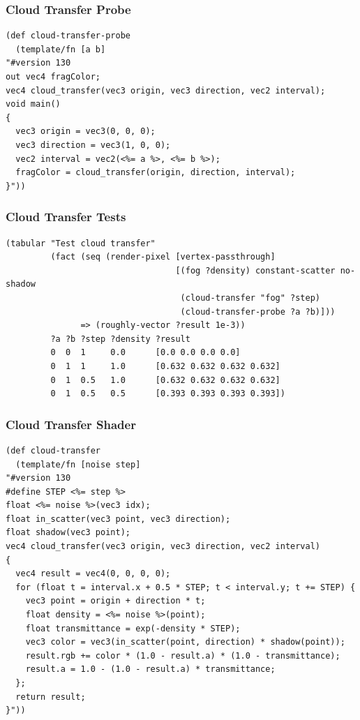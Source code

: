 \documentclass[aspectratio=169,11pt,xcolor=dvipsnames]{beamer}
\begin{document}
\begin{frame}[fragile]
  \frametitle{Cloud Transfer Probe}
  \begin{verbatim}
(def cloud-transfer-probe
  (template/fn [a b]
"#version 130
out vec4 fragColor;
vec4 cloud_transfer(vec3 origin, vec3 direction, vec2 interval);
void main()
{
  vec3 origin = vec3(0, 0, 0);
  vec3 direction = vec3(1, 0, 0);
  vec2 interval = vec2(<%= a %>, <%= b %>);
  fragColor = cloud_transfer(origin, direction, interval);
}"))
  \end{verbatim}
\end{frame}

\begin{frame}[fragile]
  \frametitle{Cloud Transfer Tests}
  \begin{verbatim}
(tabular "Test cloud transfer"
         (fact (seq (render-pixel [vertex-passthrough]
                                  [(fog ?density) constant-scatter no-shadow
                                   (cloud-transfer "fog" ?step)
                                   (cloud-transfer-probe ?a ?b)]))
               => (roughly-vector ?result 1e-3))
         ?a ?b ?step ?density ?result
         0  0  1     0.0      [0.0 0.0 0.0 0.0]
         0  1  1     1.0      [0.632 0.632 0.632 0.632]
         0  1  0.5   1.0      [0.632 0.632 0.632 0.632]
         0  1  0.5   0.5      [0.393 0.393 0.393 0.393])
  \end{verbatim}
\end{frame}

\begin{frame}[fragile]
  \frametitle{Cloud Transfer Shader}
  \begin{footnotesize}
    \begin{verbatim}
(def cloud-transfer
  (template/fn [noise step]
"#version 130
#define STEP <%= step %>
float <%= noise %>(vec3 idx);
float in_scatter(vec3 point, vec3 direction);
float shadow(vec3 point);
vec4 cloud_transfer(vec3 origin, vec3 direction, vec2 interval)
{
  vec4 result = vec4(0, 0, 0, 0);
  for (float t = interval.x + 0.5 * STEP; t < interval.y; t += STEP) {
    vec3 point = origin + direction * t;
    float density = <%= noise %>(point);
    float transmittance = exp(-density * STEP);
    vec3 color = vec3(in_scatter(point, direction) * shadow(point));
    result.rgb += color * (1.0 - result.a) * (1.0 - transmittance);
    result.a = 1.0 - (1.0 - result.a) * transmittance;
  };
  return result;
}"))
    \end{verbatim}
  \end{footnotesize}
\end{frame}
\end{document}
